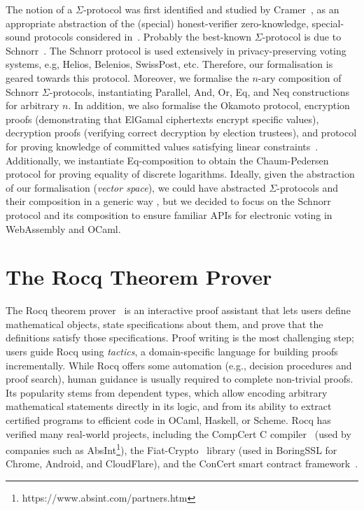 \documentclass[sigconf, anonymous]{acmart}
\begin{document}
The notion of a $\Sigma$-protocol was first identified and studied by Cramer~\cite{cramer1996modular},
as an appropriate abstraction of the (special) honest-verifier zero-knowledge, special-sound protocols considered in~\cite{cramer1994proofs}.
Probably the best-known $\Sigma$-protocol is due to Schnorr~\cite{schnorr1991efficient}.
The Schnorr protocol is used extensively in privacy-preserving voting systems, e.g, Helios, Belenios, SwissPost, etc. Therefore, 
our formalisation is geared towards this protocol. Moreover, we formalise the $n$-ary composition of Schnorr $\Sigma$-protocols, instantiating Parallel, And, Or, Eq, and Neq constructions for arbitrary $n$. In addition, we also formalise the Okamoto protocol, encryption proofs (demonstrating that ElGamal ciphertexts encrypt specific values), decryption proofs (verifying correct decryption by election trustees), and protocol for proving knowledge of committed values satisfying linear constraints~\cite{Bra97}. Additionally, we instantiate Eq-composition to obtain the Chaum-Pedersen protocol for proving equality of discrete logarithms. Ideally, given the abstraction of our formalisation (\textit{vector space}), we could have 
abstracted $\Sigma$-protocols and their composition in a generic way \cite{10.1007/978-3-642-02384-2_17},
but we decided to focus on the Schnorr protocol and its composition to ensure familiar APIs 
for electronic voting in WebAssembly and OCaml.




\section{The Rocq Theorem Prover}\label{coq_theorem}
The Rocq theorem prover~\cite{the_coq_development_team} is an interactive proof assistant that lets users define mathematical objects, state specifications about them, and prove that the definitions satisfy those specifications. Proof writing is the most challenging step; users guide Rocq using \emph{tactics}, a domain-specific language for building proofs incrementally. While Rocq offers some automation (e.g., decision procedures and proof search), human guidance is usually required to complete non-trivial proofs. Its popularity stems from dependent types, which allow encoding arbitrary mathematical statements directly in its logic, and from its ability to extract certified programs to efficient code in OCaml, Haskell, or Scheme.  Rocq has verified many real-world projects, including the CompCert C compiler~\cite{10.1145/1111037.1111042} (used by companies such as AbsInt\footnote{https://www.absint.com/partners.htm}), the Fiat-Crypto~\cite{8835346} library (used in BoringSSL for Chrome, Android, and CloudFlare), and the ConCert smart contract framework~\cite{10.1145/3372885.3373829}.
\end{document}
